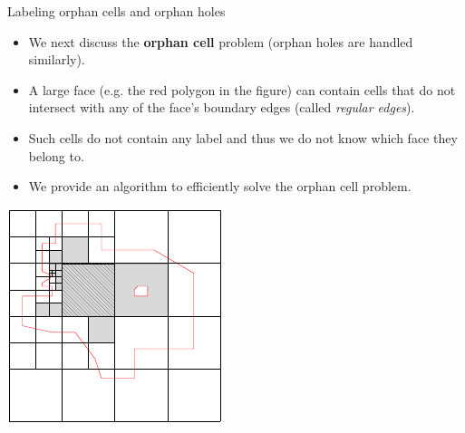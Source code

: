 \documentclass{beamer}
\begin{document}
    \begin{frame}{Labeling orphan cells and orphan holes}
        \begin{minipage}{0.59\textwidth}
            \begin{itemize}
                \item We next discuss the \textbf{orphan cell} problem (orphan holes are handled similarly).   
                \item A large face (e.g. the red polygon in the figure) can contain cells that do not intersect with any of the face's boundary edges (called \textit{regular edges}).
                \item Such cells do not contain any label and thus we do not know which face they belong to.
                \item We provide an algorithm to efficiently solve the orphan cell problem.  
            \end{itemize}
        \end{minipage}\hfill %
        \begin{minipage}{0.4\textwidth}
            \centering
            \includegraphics[width=\textwidth]{figures/holes1}
            \end{minipage}
    \end{frame}
    
\end{document}
